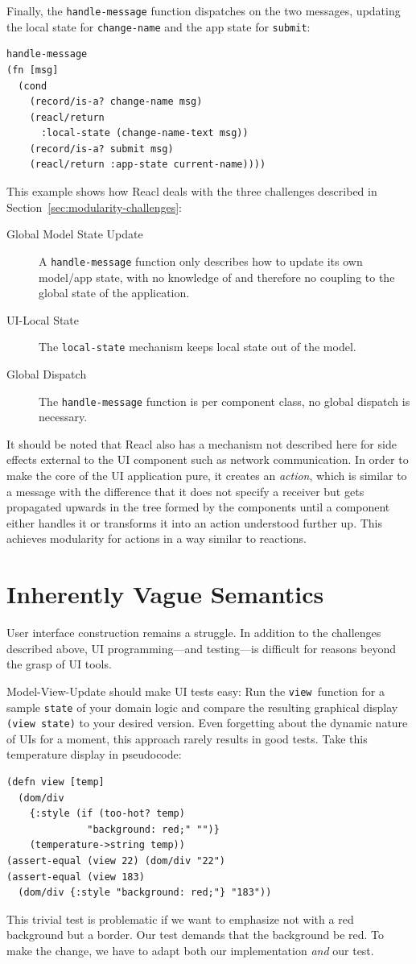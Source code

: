 \documentclass[sigplan,screen]{acmart}
\begin{document}
Finally, the \texttt{handle-message} function dispatches on the two
messages, updating the local state for \texttt{change-name} and the
app state for \texttt{submit}:
%
\begin{verbatim}
handle-message
(fn [msg]
  (cond
    (record/is-a? change-name msg)
    (reacl/return
      :local-state (change-name-text msg))
    (record/is-a? submit msg)
    (reacl/return :app-state current-name))))
\end{verbatim}
%
This example shows how Reacl deals with the three challenges described
in Section~\ref{sec:modularity-challenges}:
%
\begin{description}
\item[Global Model State Update] A \texttt{handle-message} function
  only describes how to update its own model/app state, with no
  knowledge of and therefore no coupling to the global state of the
  application.
\item[UI-Local State] The \texttt{local-state} mechanism keeps local
  state out of the model.
\item[Global Dispatch] The \texttt{handle-message} function is per
  component class, no global dispatch is necessary.
\end{description}
%
It should be noted that Reacl also has a mechanism not described here
for side effects external to the UI component 
such as network
communication.  In order to make the core of the UI application pure,
it creates an \textit{action}, which is similar to a message with the
difference that it does not specify a receiver but gets propagated
upwards in the tree formed by the components until a component either
handles it or transforms it into an action understood further up.
This achieves modularity for actions in a way similar to reactions.

\section{Inherently Vague Semantics}
\label{sec:vague-semantics}

User interface construction remains a struggle. In addition to
the challenges described above, UI programming---and testing---is
difficult for reasons beyond the grasp of UI
tools.

Model-View-Update should make UI tests easy: Run the
\texttt{view }function for a sample \texttt{state} of
your domain logic and compare the resulting graphical display
\texttt{(view state)} to your desired version. Even forgetting about
the dynamic nature of UIs for a moment, this approach rarely results
in good tests. Take this temperature display in pseudocode:
%
\begin{verbatim}
(defn view [temp]
  (dom/div
    {:style (if (too-hot? temp)
              "background: red;" "")}
    (temperature->string temp))
(assert-equal (view 22) (dom/div "22")
(assert-equal (view 183)
  (dom/div {:style "background: red;"} "183"))
\end{verbatim}
%
This trivial test is problematic if we want to emphasize
not with a red background but a border.  Our test
demands that the background be red. To make the change,
we have to adapt both our implementation \textit{and} our
test.
\end{document}
